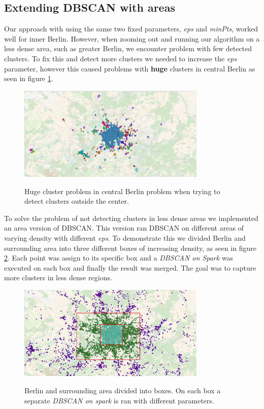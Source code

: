 \subsection{Extending DBSCAN with areas}
 Our approach with using the same two fixed parameters, \textit{eps} and \textit{minPts}, worked well for inner Berlin. However, when zooming out and running our algorithm on a less dense area, such as greater Berlin, we encounter problem with few detected clusters. To fix this and detect more clusters we needed to increase the \textit{eps} parameter, however this caused problems with \textbf{huge} clusters in central Berlin as seen in figure \ref{fig:huge_cluster}.
\begin{figure}[!ht]
	\centering
	\includegraphics[width=0.8\textwidth]{images/big_cluster.PNG}\\
	\caption{ Huge cluster problem in central Berlin problem when trying to detect clusters outside the center. }
	\label{fig:huge_cluster}
\end{figure}
To solve the problem of not detecting clusters in less dense areas we implemented an area version of DBSCAN. This version ran DBSCAN on different areas of varying density with different \textit{eps}. To demonstrate this we divided Berlin and surrounding area into three different boxes of increasing density, as seen in figure \ref{fig:boxes}. Each point was assign to its specific box and a \textit{DBSCAN on Spark} was executed on each box and finally the result was merged. The goal was to capture more clusters in less dense regions. 
\begin{figure}[!ht]
	\centering
	\includegraphics[width=0.8\textwidth]{images/boxes.PNG}\\
	\caption{  Berlin and surrounding area divided into boxes. On each box a separate\textit{ DBSCAN on spark} is ran with different parameters. }
	\label{fig:boxes}
\end{figure}
